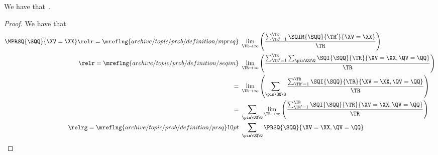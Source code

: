 \begin{proposition}
  We have that\ \mprsqexprprop.%
\end{proposition}

\begin{proof}
  We have that
  \begin{align*}
  \MPRSQ{\SQQ}{\XV = \XX}
                    \relr = {\mreflng{archive/topic/prob/definition/mprsq}} \ & 
                    \lim_{\TR \rightarrow \infty}\left(\frac{\sum_{\TR' = 1}^{\TR}\SQIM{\SQQ}{\TR'}{\XV = \XX}}{\TR}\right)\\
                    \relr = {\mreflng{archive/topic/prob/definition/seqim}} \ & 
                    \lim_{\TR \rightarrow \infty}\left(\frac{\sum_{\TR' = 1}^{\TR}\sum_{\pin\QQ\Q} \SQI{\SQQ}{\TR}{\XV = \XX, \QV = \QQ}}{\TR}\right)\\
                    = \ & 
                    \lim_{\TR \rightarrow \infty}\left(\sum_{\pin\QQ\Q} \frac{\sum_{\TR' = 1}^{\TR}\SQI{\SQQ}{\TR}{\XV = \XX, \QV = \QQ}}{\TR}\right)\\
                    = \ & 
                    \sum_{\pin\QQ\Q} \lim_{\TR \rightarrow \infty}\left(\frac{\sum_{\TR' = 1}^{\TR}\SQI{\SQQ}{\TR}{\XV = \XX, \QV = \QQ}}{\TR}\right)\\
                    \relrg = {\mreflng{archive/topic/prob/definition/prsq}} 10pt \ & 
                    \sum_{\pin\QQ\Q}\PRSQ{\SQQ}{\XV = \XX, \QV = \QQ}
  \end{align*}
\end{proof}
